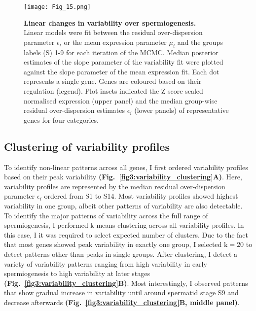 \newpage

\begin{figure}[!h]
\centering
\texttt{[image: Fig\_15.png]}
\caption[Linear changes in variability over spermiogenesis]{\textbf{Linear changes in variability over spermiogenesis.}\\
Linear models were fit between the residual over-dispersion parameter $\epsilon_i$ or the mean expression parameter $\mu_i$ and the groups labels (S) 1-9 for each iteration of the MCMC. Median posterior estimates of the slope parameter of the variability fit were plotted against the slope parameter of the mean expression fit. Each dot represents a single gene. Genes are coloured based on their regulation (legend). Plot insets indicated the Z score scaled normalised expression (upper panel) and the median group-wise residual over-dispersion estimates $\epsilon_i$ (lower panels) of representative genes for four categories.}
\label{fig3:linear_variability}
\end{figure}

\newpage

\subsection{Clustering of variability profiles}

To identify non-linear patterns across all genes, I first ordered variability profiles based on their peak variability \textbf{(Fig.~\ref{fig3:variability_clustering}A)}. Here, variability profiles are represented by the median residual over-dispersion parameter $\epsilon_i$  ordered from S1 to S14. Most variability profiles showed highest variability in one group, albeit other patterns of variability are also detectable. \\

To identify the major patterns of variability across the full range of spermiogenesis, I performed k-means clustering across all variability profiles. In this case, I it was required to select expected number of clusters. Due to the fact that most genes showed peak variability in exactly one group, I selected $\text{k}=20$ to detect patterns other than peaks in single groups. After clustering, I detect a variety of variability patterns ranging from high variability in early spermiogenesis to high variability at later stages \textbf{(Fig.~\ref{fig3:variability_clustering}B)}. Most interestingly, I observed patterns that show gradual increase in variability until around spermatid stage S9 and decrease afterwards \textbf{(Fig.~\ref{fig3:variability_clustering}B, middle panel)}. \\

